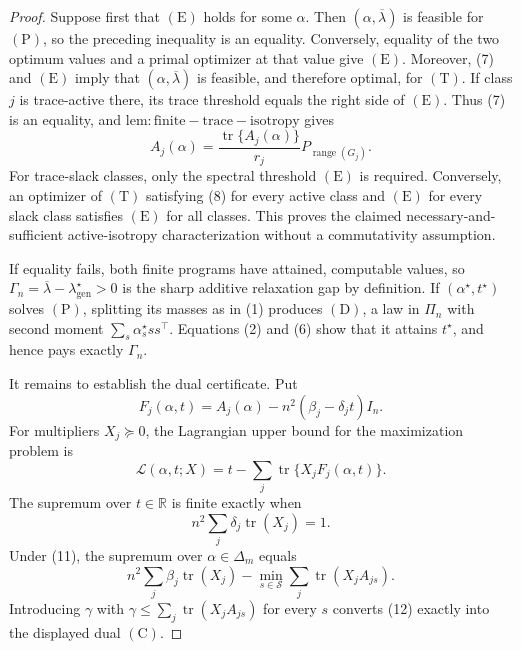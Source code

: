 \documentclass{article}
\begin{document}
\begin{proof}
Suppose first that \((\mathrm E)\) holds for some \(\alpha\).  Then \((\alpha,\overline\lambda)\) is feasible for \((\mathrm P)\), so the preceding inequality is an equality.  Conversely, equality of the two optimum values and a primal optimizer at that value give \((\mathrm E)\).  Moreover, (7) and \((\mathrm E)\) imply that \((\alpha,\overline\lambda)\) is feasible, and therefore optimal, for \((\mathrm T)\).  If class \(j\) is trace-active there, its trace threshold equals the right side of \((\mathrm E)\).  Thus (7) is an equality, and \(\mathrm{lem:finite-trace-isotropy}\) gives
\[
A_j(\alpha)
=\frac{\operatorname{tr}\{A_j(\alpha)\}}{r_j}
P_{\operatorname{range}(G_j)}. \tag{8}
\]
For trace-slack classes, only the spectral threshold \((\mathrm E)\) is required.  Conversely, an optimizer of \((\mathrm T)\) satisfying (8) for every active class and \((\mathrm E)\) for every slack class satisfies \((\mathrm E)\) for all classes.  This proves the claimed necessary-and-sufficient active-isotropy characterization without a commutativity assumption.

If equality fails, both finite programs have attained, computable values, so
\(\Gamma_n=\overline\lambda-\lambda_{\mathrm{gen}}^\star>0\) is the sharp additive relaxation gap by definition.  If \((\alpha^\star,t^\star)\) solves \((\mathrm P)\), splitting its masses as in (1) produces \((\mathrm D)\), a law in \(\Pi_n\) with second moment \(\sum_s\alpha_s^\star ss^\top\).  Equations (2) and (6) show that it attains \(t^\star\), and hence pays exactly \(\Gamma_n\).

It remains to establish the dual certificate.  Put
\[
F_j(\alpha,t)=A_j(\alpha)-n^2(\beta_j-\delta_jt)I_n. \tag{9}
\]
For multipliers \(X_j\succeq0\), the Lagrangian upper bound for the maximization problem is
\[
\mathcal L(\alpha,t;X)
=t-\sum_j\operatorname{tr}\{X_jF_j(\alpha,t)\}. \tag{10}
\]
The supremum over \(t\in\mathbb R\) is finite exactly when
\[
n^2\sum_j\delta_j\operatorname{tr}(X_j)=1. \tag{11}
\]
Under (11), the supremum over \(\alpha\in\Delta_m\) equals
\[
n^2\sum_j\beta_j\operatorname{tr}(X_j)
-\min_{s\in\mathscr S}\sum_j\operatorname{tr}(X_jA_{js}). \tag{12}
\]
Introducing \(\gamma\) with
\(\gamma\le\sum_j\operatorname{tr}(X_jA_{js})\) for every \(s\) converts (12) exactly into the displayed dual \((\mathrm C)\).


\end{proof}
\end{document}
